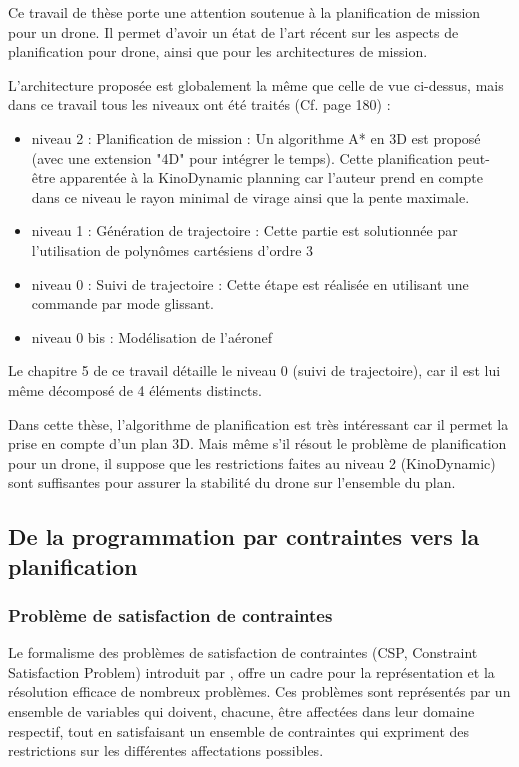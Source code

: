 \cite{dicheva_planification_2012} Ce travail de thèse porte une attention soutenue à la planification de mission pour un drone. Il permet d'avoir un état de l'art récent sur les aspects de planification pour drone, ainsi que pour les architectures de mission.

L'architecture proposée est globalement la même que celle de \cite{chanthery_planification_2005} vue ci-dessus, mais dans ce travail tous les niveaux ont été traités (Cf. page 180) : 
\begin{itemize}
	\item niveau 2 : Planification de mission : Un algorithme A* en 3D est proposé (avec une extension "4D" pour intégrer le temps). Cette planification peut-être apparentée à la KinoDynamic planning car l'auteur prend en compte dans ce niveau le rayon minimal de virage ainsi que la pente maximale.
	\item niveau 1 : Génération de trajectoire : Cette partie est solutionnée par l'utilisation de polynômes cartésiens d'ordre 3
	\item niveau 0 : Suivi de trajectoire : Cette étape est réalisée en utilisant une commande par mode glissant.
	\item niveau 0 bis : Modélisation de l'aéronef
\end{itemize} 

Le chapitre 5 de ce travail détaille le niveau 0 (suivi de trajectoire), car il est lui même décomposé de 4 éléments distincts.

Dans cette thèse, l'algorithme de planification est très intéressant car il permet la prise en compte d'un plan 3D. Mais même s'il résout le problème de planification pour un drone, il suppose que les restrictions faites au niveau 2 (KinoDynamic) sont suffisantes pour assurer la stabilité du drone sur l'ensemble du plan.

\subsection{De la programmation par contraintes vers la planification}
\subsubsection{Problème de satisfaction de contraintes}
Le formalisme des problèmes de satisfaction de contraintes (CSP, Constraint Satisfaction Problem) introduit par \cite{montanari_networks_1974}, offre un cadre pour la représentation et la résolution efficace de nombreux problèmes. Ces problèmes sont représentés par un ensemble de variables qui doivent, chacune, être affectées dans leur domaine respectif, tout en satisfaisant un ensemble de contraintes qui expriment des restrictions sur les différentes affectations possibles.

